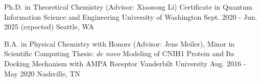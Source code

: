 


\begin{cventries}


\cventryedu
{Ph.D. in Theoretical Chemistry (Advisor: Xiaosong Li) \newline
Certificate in Quantum Information Science and Engineering} %
{University of Washington} %
{Sept. 2020 - Jun. 2025 (expected)} %
{Seattle, WA\vspace{-0.5cm}} %

\vspace{0.4cm}

\cventryedu
{B.A. in Physical Chemistry with Honors (Advisor: Jens Meiler), Minor in Scientific Computing \newline
Thesis: \textit{de novo} Modeling of CNIH1 Protein and Its Docking Mechanism with AMPA Receptor}%
{Vanderbilt University} %
{Aug. 2016 - May 2020} %
{Nashville, TN} %


\end{cventries}
